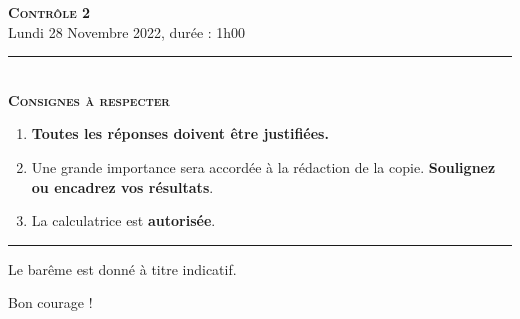 \documentclass[11pt]{article}
\begin{document}

\begin{center}
\textbf{\LARGE \textsc{Contrôle 2}}\\[2mm]

{\large Lundi 28 Novembre 2022, durée : 1h00}\\[1mm]
\noindent\rule{8cm}{0.4pt}\\[1mm]
\textbf{\textsc{Consignes à respecter}}
\begin{enumerate}[label=\textbf{\arabic*/}]
\item \textbf{Toutes les réponses doivent être justifiées.}
\item Une grande importance sera accordée à la rédaction de la
  copie. \textbf{Soulignez ou encadrez vos résultats}.
\item La calculatrice est \textbf{autorisée}.
    \end{enumerate}
\noindent\rule{12cm}{0.4pt}
\end{center}

\vspace{2mm}
\noindent Le barême est donné à titre indicatif.
\vspace{2mm}
\begin{center}
  Bon courage !
\end{center}
\end{document}
